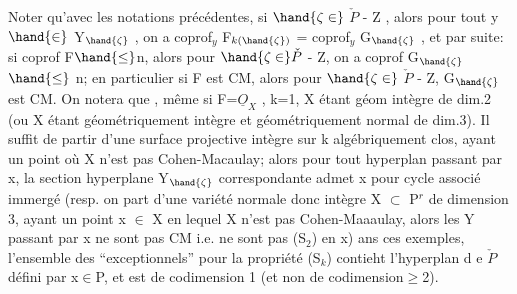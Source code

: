 
Noter qu'avec les notations précédentes, si $\hand{\zeta\in}$ $\check{P}$ - Z , alors pour tout
y $\hand{\in}$ Y$_{\hand{\zeta}}$ , on a coprof$_y$ F$_{k(\hand{\zeta})}$ = coprof$_y$ G$_{\hand{\zeta}}$ , et par suite: si coprof F$\hand{\leq}$n,
alors pour $\hand{\zeta\in}\check{P}$ - Z, on a coprof G$_{\hand{\zeta}}$ $\hand{\leq}$ n; en particulier si F est CM, alors
pour $\hand{\zeta\in}$ $\check{P}$ - Z, G$_{\hand{\zeta}}$ est CM. 
 On notera que  
, même si F=$\underline{O}_X$ , k=1, X étant géom intègre de dim.2 (ou  X étant
géométriquement intègre et géométriquement normal de dim.3). Il suffit
de partir d'une surface projective  intègre  sur k algébriquement
clos, ayant un point  où X n'est pas Cohen-Macaulay; alors pour tout
hyperplan passant par x, la section hyperplane Y$_{\hand{\zeta}}$ correspondante admet
x pour cycle associé immergé (resp. on part d'une variété normale\hand{,} \hand{(}donc
 intègre X $\subset$ P$^r$ de dimension 3, ayant un point x $\in$ X en lequel X n'est pas
Cohen-Maaaulay, alors les Y passant par x ne sont pas  CM i.e. ne sont
pas (S$_2$) en x) ans ces exemples, l'ensemble des \hand{$\zeta$} ``exceptionnels''
pour la propriété (S$_k$) contieht l'hyperplan d e $\check{P}$ défini par x$\in$P, et est
de codimension 1 (et non de codimension$\geq$2). 



